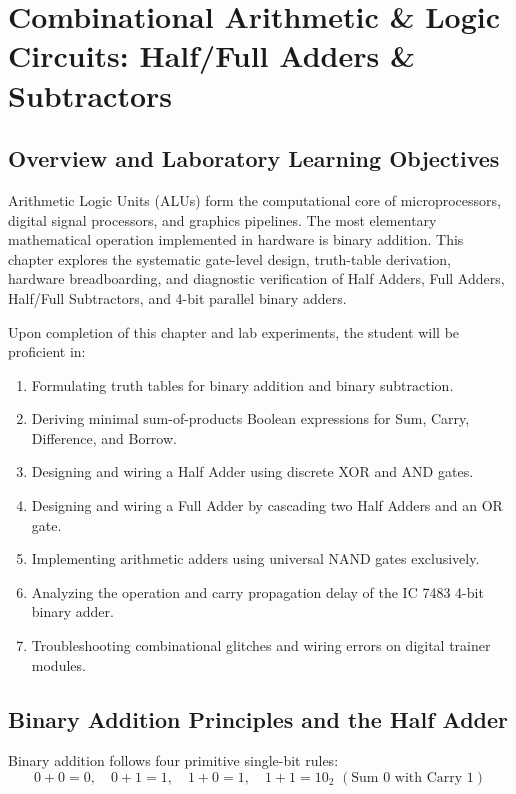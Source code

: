 \chapter{Combinational Arithmetic \& Logic Circuits: Half/Full Adders \& Subtractors}
\label{chap:adders}

\section{Overview and Laboratory Learning Objectives}
Arithmetic Logic Units (ALUs) form the computational core of microprocessors, digital signal processors, and graphics pipelines. The most elementary mathematical operation implemented in hardware is binary addition. This chapter explores the systematic gate-level design, truth-table derivation, hardware breadboarding, and diagnostic verification of Half Adders, Full Adders, Half/Full Subtractors, and 4-bit parallel binary adders.

\begin{important}
Upon completion of this chapter and lab experiments, the student will be proficient in:
\begin{enumerate}[leftmargin=1.5em]
    \item Formulating truth tables for binary addition and binary subtraction.
    \item Deriving minimal sum-of-products Boolean expressions for Sum, Carry, Difference, and Borrow.
    \item Designing and wiring a Half Adder using discrete XOR and AND gates.
    \item Designing and wiring a Full Adder by cascading two Half Adders and an OR gate.
    \item Implementing arithmetic adders using universal NAND gates exclusively.
    \item Analyzing the operation and carry propagation delay of the IC 7483 4-bit binary adder.
    \item Troubleshooting combinational glitches and wiring errors on digital trainer modules.
\end{enumerate}
\end{important}

\section{Binary Addition Principles and the Half Adder}
Binary addition follows four primitive single-bit rules:
\[ 0 + 0 = 0, \quad 0 + 1 = 1, \quad 1 + 0 = 1, \quad 1 + 1 = 10_2 \,\,(\text{Sum } 0 \text{ with Carry } 1) \]

